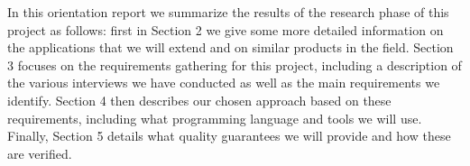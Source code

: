 In this orientation report we summarize the results of the research phase of this project as follows: first in Section 2 we give some more detailed information on the applications that we will extend and on similar products in the field. Section 3 focuses on the requirements gathering for this project, including a description of the various interviews we have conducted as well as the main requirements we identify. Section 4 then describes our chosen approach based on these requirements, including what programming language and tools we will use. Finally, Section 5 details what quality guarantees we will provide and how these are verified.